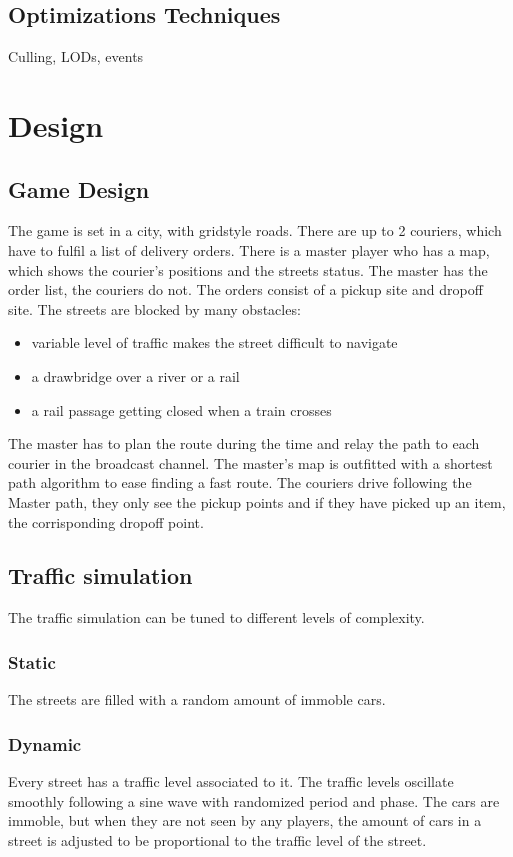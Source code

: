 \documentclass{article}
\begin{document}
\clearpage

\subsection{Optimizations Techniques}
Culling, LODs, events

\clearpage

\section{Design}
\subsection{Game Design}
The game is set in a city, with gridstyle roads.
There are up to 2 couriers, which have to fulfil a list of delivery orders.
There is a master player who has a map, which shows the courier's positions and the streets status. The master has the order list, the couriers do not.
The orders consist of a pickup site and dropoff site.
The streets are blocked by many obstacles:
\begin{itemize}
  \item variable level of traffic makes the street difficult to navigate
  \item a drawbridge over a river or a rail
  \item a rail passage getting closed when a train crosses
\end{itemize}
The master has to plan the route during the time and relay the path to each courier in the broadcast channel.
The master's map is outfitted with a shortest path algorithm to ease finding a fast route.
The couriers drive following the Master path, they only see the pickup points and if they have picked up an item, the corrisponding dropoff point.

\subsection{Traffic simulation}
The traffic simulation can be tuned to different levels of complexity.
\subsubsection{Static}
The streets are filled with a random amount of immoble cars.
\subsubsection{Dynamic}
Every street has a traffic level associated to it. The traffic levels oscillate smoothly following a sine wave with randomized period and phase. The cars are immoble, but when they are not seen by any players, the amount of cars in a street is adjusted to be proportional to the traffic level of the street.
\end{document}
